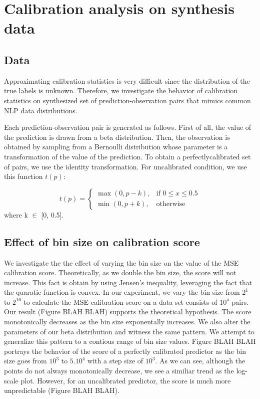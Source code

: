 \section{Calibration analysis on synthesis data}

\subsection{Data}

Approximating calibration statistics is very difficult since the distribution of the true labels is unknown. Therefore, we investigate the behavior of calibration statistics on synthesized set of prediction-observation pairs that mimics common NLP data distributions. 

Each prediction-observation pair is generated as follows. First of all, the value of the prediction is drawn from a beta distribution. Then, the observation is obtained by sampling from a Bernoulli distribution whose parameter is a transformation of the value of the prediction. To obtain a perfectlycalibrated set of pairs, we use the identity transformation. For uncalibrated condition, we use this function $t(p)$:

\[
        t(p) =
\begin{cases}
  \max(0, p - k), & \text{if } 0 \leq x \leq 0.5 \\
  \min(0, p + k), & \text{otherwise}
\end{cases}
\]
where k $\in$ [0, 0.5].

\subsection{Effect of bin size on calibration score}

We investigate the the effect of varying the bin size on the value of the MSE calibration score. Theoretically, as we double the bin size, the score will not increase. This fact is obtain by using Jensen's inequality, leveraging the fact that the quaratic function is convex. In our experiment, we vary the bin size from $2^1$ to $2^16$ to calculate the MSE calibration score on a data set consists of $10^5$ pairs. Our result (Figure BLAH BLAH) supports the theoretical hypothesis. The score monotonically decreases as the bin size exponentally increases. We also alter the parameters of our beta distribution and witness the same pattern. We attempt to generalize this pattern to a contious range of bin size values. Figure BLAH BLAH portrays the behavior of the score of a perfectly calibrated predictor as the bin size goes from $10^3$ to $5.10^4$ with a step size of $10^3$. As we can see, although the points do not always monotonically decrease, we see a similiar trend as the log-scale plot. However, for an uncalibrated predictor, the score is much more unpredictable (Figure BLAH BLAH). 

